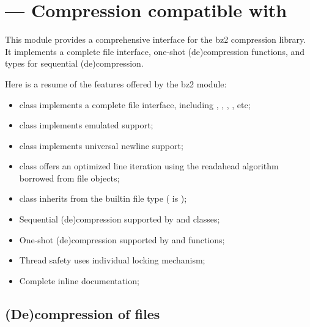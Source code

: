 \section{ ---
         Compression compatible with }



This module provides a comprehensive interface for the bz2 compression library.
It implements a complete file interface, one-shot (de)compression functions,
and types for sequential (de)compression.

Here is a resume of the features offered by the bz2 module:

\begin{itemize}
\item {} class implements a complete file interface, including
      , ,
      , , etc;
\item {} class implements emulated  support;
\item {} class implements universal newline support;
\item {} class offers an optimized line iteration using
      the readahead algorithm borrowed from file objects;
\item {} class inherits from the builtin file type
      ( is );
\item Sequential (de)compression supported by  and
       classes;
\item One-shot (de)compression supported by  and
       functions;
\item Thread safety uses individual locking mechanism;
\item Complete inline documentation;
\end{itemize}


\subsection{(De)compression of files}

